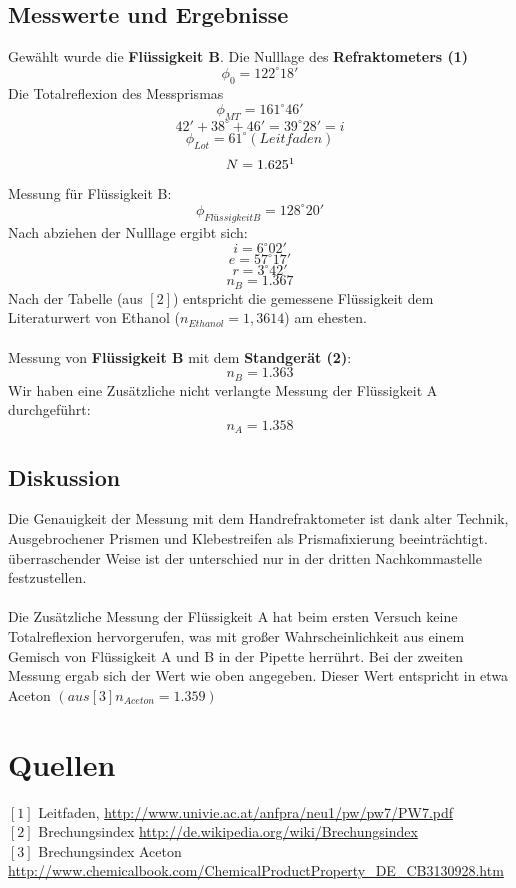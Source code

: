 \documentclass[12pt,a4paper]{article}
\begin{document}
\begin{multicols}{2}
\subsection{Messwerte und Ergebnisse}
Gewählt wurde die \textbf{Flüssigkeit B}. Die Nulllage des \textbf{Refraktometers (1)}
$$\phi_0 = 122^\circ 18'$$
Die Totalreflexion des Messprismas
$$\phi_{MT} = 161^\circ 46'$$
$$42' + 38^\circ + 46' = 39^\circ 28' = i$$
$$\phi_{Lot} = 61^\circ (Leitfaden)$$
$$N = 1.625\footnote{Formel aus [1] (19)} $$
Messung für Flüssigkeit B:\\
$$\phi_{FlüssigkeitB} = 128^\circ 20'$$
Nach abziehen der Nulllage ergibt sich:
$$i = 6^\circ 02'$$
$$e = 57^\circ 17'$$
$$r = 3^\circ 42'$$
$$n_B = 1.367$$
Nach der Tabelle (aus $[2]$) entspricht die gemessene Flüssigkeit dem Literaturwert von Ethanol ($n_{Ethanol} = 1,3614$) am ehesten.\\
\\
Messung von \textbf{Flüssigkeit B} mit dem \textbf{Standgerät (2)}:\\
$$n_B = 1.363$$
Wir haben eine Zusätzliche nicht verlangte Messung der Flüssigkeit A durchgeführt:
$$n_A = 1.358$$


\subsection{Diskussion}
Die Genauigkeit der Messung mit dem Handrefraktometer ist dank alter Technik, Ausgebrochener Prismen und Klebestreifen als Prismafixierung beeinträchtigt. überraschender Weise ist der unterschied nur in der dritten Nachkommastelle festzustellen.\\
\\
Die Zusätzliche Messung der Flüssigkeit A hat beim ersten Versuch keine Totalreflexion hervorgerufen, was mit großer Wahrscheinlichkeit aus einem Gemisch von Flüssigkeit A und B in der Pipette herrührt. Bei der zweiten Messung ergab sich der Wert wie oben angegeben. Dieser Wert entspricht in etwa Aceton $(aus [3] n_{Aceton}=1.359)$

\section{Quellen}
$[1]$ Leitfaden, \url{http://www.univie.ac.at/anfpra/neu1/pw/pw7/PW7.pdf}\\
$[2]$ Brechungsindex \url{http://de.wikipedia.org/wiki/Brechungsindex}\\
$[3]$ Brechungsindex Aceton \url{http://www.chemicalbook.com/ChemicalProductProperty_DE_CB3130928.htm}

\end{multicols}
\end{document}
